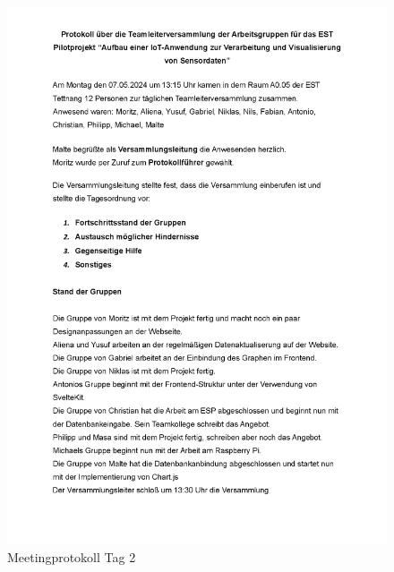 \begin{figure}[h]
	\centering
	\includegraphics[width=14.5cm]{images/Protokoll2.png}
	\caption{Meetingprotokoll Tag 2}
	\label{fig:protokoll2}
\end{figure}

